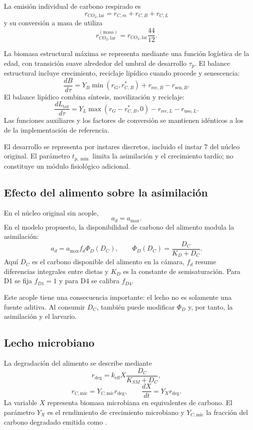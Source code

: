La emisión individual de carbono respirado es
\[
\boxed{
r_{CO_2,\mathrm{lar}}
=r_{C,m}+r_{C,B}+r_{C,L}
}
\]
y su conversión a masa de \co{} utiliza
\[
r_{CO_2,\mathrm{lar}}^{(\mathrm{masa})}
=r_{CO_2,\mathrm{lar}}\frac{44}{12}.
\]

La biomasa estructural máxima se representa mediante una función
logística de la edad, con transición suave alrededor del umbral de
desarrollo $\tau_p$. El balance estructural incluye crecimiento,
reciclaje lipídico cuando procede y senescencia:
\[
\frac{dB}{d\tau}
=Y_B\min(r_G,r_{C,B}^{*})
+r_{\mathrm{rec},B}
-r_{\mathrm{sen},B}.
\]
El balance lipídico combina síntesis, movilización y reciclaje:
\[
\frac{dL_{\mathrm{tot}}}{d\tau}
=Y_L\max(r_G-r_{C,B}^{*},0)
-r_{\mathrm{rec},L}
-r_{\mathrm{uso},L}.
\]
Las funciones auxiliares y los factores de conversión se mantienen
idénticos a los de la implementación de referencia.

El desarrollo se representa por instares discretos, incluido el instar
7 del núcleo original. El parámetro $t_{p,\min}$ limita la asimilación
y el crecimiento tardío; no constituye un módulo fisiológico adicional.

\subsection{Efecto del alimento sobre la asimilación}

En el núcleo original sin acople,
\[
a_d=a_{\max}.
\]
En el modelo propuesto, la disponibilidad de carbono del alimento
modula la asimilación:
\[
\boxed{
a_d=a_{\max}f_d\Phi_D(D_C),
\qquad
\Phi_D(D_C)=\frac{D_C}{K_D+D_C}.
}
\]
Aquí $D_C$ es el carbono disponible del alimento en la cámara, $f_d$
resume diferencias integrales entre dietas y $K_D$ es la constante de
semisaturación. Para D1 se fija $f_{D1}=1$ y para D4 se calibra
$f_{D4}$.

Este acople tiene una consecuencia importante: el lecho no es solamente
una fuente aditiva. Al consumir $D_C$, también puede modificar
$\Phi_D$ y, por tanto, la asimilación y el \co{} larvario.

\subsection{Lecho microbiano}

La degradación del alimento se describe mediante
\[
r_{\deg}
=k_{\mathrm{eff}}X\frac{D_C}{K_{SM}+D_C},
\]
\[
r_{C,\mathrm{mic}}=Y_{C,\mathrm{mic}}r_{\deg},
\qquad
\frac{dX}{dt}=Y_Xr_{\deg}.
\]
La variable $X$ representa biomasa microbiana en equivalentes de
carbono. El parámetro $Y_X$ es el rendimiento de crecimiento microbiano
y $Y_{C,\mathrm{mic}}$ la fracción del carbono degradado emitida como
\co{}.

